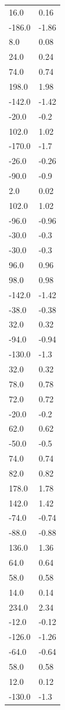 \begin{longtable}{ll}
16.0 & 0.16 \\
-186.0 & -1.86 \\
8.0 & 0.08 \\
24.0 & 0.24 \\
74.0 & 0.74 \\
198.0 & 1.98 \\
-142.0 & -1.42 \\
-20.0 & -0.2 \\
102.0 & 1.02 \\
-170.0 & -1.7 \\
-26.0 & -0.26 \\
-90.0 & -0.9 \\
2.0 & 0.02 \\
102.0 & 1.02 \\
-96.0 & -0.96 \\
-30.0 & -0.3 \\
-30.0 & -0.3 \\
96.0 & 0.96 \\
98.0 & 0.98 \\
-142.0 & -1.42 \\
-38.0 & -0.38 \\
32.0 & 0.32 \\
-94.0 & -0.94 \\
-130.0 & -1.3 \\
32.0 & 0.32 \\
78.0 & 0.78 \\
72.0 & 0.72 \\
-20.0 & -0.2 \\
62.0 & 0.62 \\
-50.0 & -0.5 \\
74.0 & 0.74 \\
82.0 & 0.82 \\
178.0 & 1.78 \\
142.0 & 1.42 \\
-74.0 & -0.74 \\
-88.0 & -0.88 \\
136.0 & 1.36 \\
64.0 & 0.64 \\
58.0 & 0.58 \\
14.0 & 0.14 \\
234.0 & 2.34 \\
-12.0 & -0.12 \\
-126.0 & -1.26 \\
-64.0 & -0.64 \\
58.0 & 0.58 \\
12.0 & 0.12 \\
-130.0 & -1.3 \\

\end{longtable}
